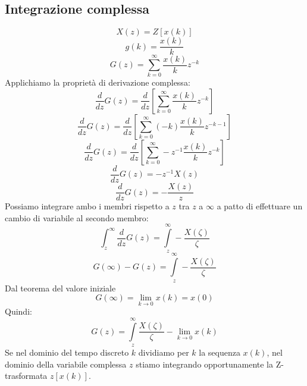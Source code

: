 \documentclass[a4paper]{report}
\begin{document}
\subsection{Integrazione complessa}
\[
X(z) = Z[x(k)]
\]
\[
g(k) = \dfrac{x(k)}{k}
\]
\[
G(z) = \sum_{k = 0}^{\infty} \dfrac{x(k)}{k}z^{-k}
\]
Applichiamo la propriet\`a di derivazione complessa:
\[
\dfrac{d}{dz}G(z) = \dfrac{d}{dz}\left[\sum_{k = 0}^{\infty}
  \dfrac{x(k)}{k}z^{-k}\right] 
\]
\[
\dfrac{d}{dz}G(z) = \dfrac{d}{dz}\left[\sum_{k = 0}^{\infty}
  (-k)\dfrac{x(k)}{k}z^{-k-1}\right] 
\]
\[
\dfrac{d}{dz}G(z) = \dfrac{d}{dz}\left[\sum_{k = 0}^{\infty}
  -z^{-1}\dfrac{x(k)}{k}z^{-k}\right] 
\]
\[
\dfrac{d}{dz}G(z) = -z^{-1}X(z)
\]
\[
\dfrac{d}{dz}G(z) = -\dfrac{X(z)}{z}
\]
Possiamo integrare ambo i membri rispetto a $z$ tra $z$ a $\infty$ a
patto di effettuare un cambio di variabile al secondo membro:
\[
\int_{z}^{\infty}\dfrac{d}{dz}G(z) = \int\limits_{z}^{\infty}
-\dfrac{X(\zeta)}{\zeta}
\]
\[
G(\infty) - G(z) = \int\limits_{z}^{\infty}
-\dfrac{X(\zeta)}{\zeta}
\]
Dal teorema del valore iniziale
\[
G(\infty) = \lim\limits_{k \to 0} x(k) = x(0)
\]
Quindi:
\[
G(z) = \int\limits_{z}^{\infty} \dfrac{X(\zeta)}{\zeta} - \lim_{k \to
  0} x(k)
\]
Se nel dominio del tempo discreto $k$ dividiamo per $k$ la sequenza
$x(k)$, nel dominio della variabile complessa $z$ stiamo
integrando opportunamente la Z-trasformata $z[x(k)]$.
\end{document}
